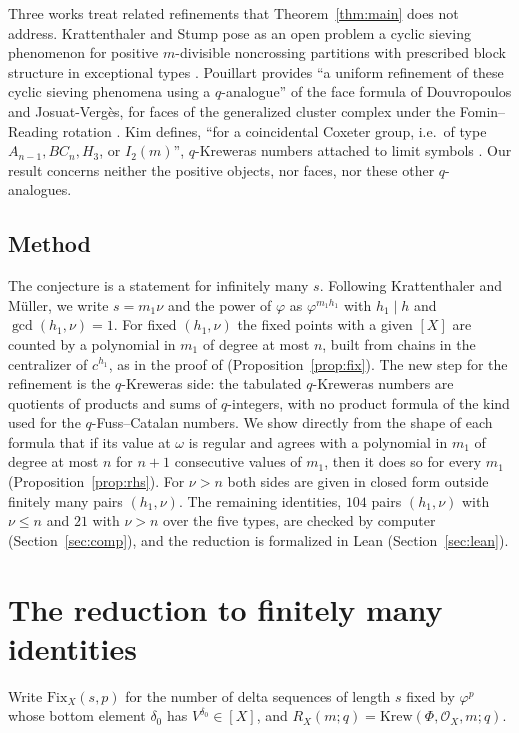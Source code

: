 \documentclass[11pt]{article}
\theoremstyle{definition}
\newcommand{\Krew}{\mathrm{Krew}}
\newcommand{\Fix}{\mathrm{Fix}}
\newcommand{\Oc}{\mathcal{O}}
\begin{document}
Three works treat related refinements that Theorem~\ref{thm:main} does
not address. Krattenthaler and Stump pose as an open problem a cyclic
sieving phenomenon for positive $m$-divisible noncrossing partitions with
prescribed block structure in exceptional types
\cite[\S7.2, Question~7.5 and Open Problem~7.6]{KS}. Pouillart provides ``a
uniform refinement of these cyclic sieving phenomena using a $q$-analogue''
of the face formula of Douvropoulos and Josuat-Vergès, for faces of the
generalized cluster complex under the Fomin--Reading rotation \cite{Pou}.
Kim defines, ``for a coincidental Coxeter group, i.e.\ of type $A_{n-1},
BC_n, H_3$, or $I_2(m)$'', $q$-Kreweras numbers attached to limit symbols
\cite{Kim}. Our result concerns neither the positive objects, nor faces, nor
these other $q$-analogues.

\subsection{Method}
The conjecture is a statement for infinitely many $s$. Following
Krattenthaler and Müller, we write $s=m_1\nu$ and the power of $\varphi$
as $\varphi^{m_1h_1}$ with $h_1\mid h$ and $\gcd(h_1,\nu)=1$. For fixed
$(h_1,\nu)$ the fixed points with a given $[X]$ are counted by a polynomial
in $m_1$ of degree at most $n$, built from chains in the centralizer of
$c^{h_1}$, as in the proof of \cite[Lemma~30]{KM}
(Proposition~\ref{prop:fix}). The new step for the refinement is the
$q$-Kreweras side: the tabulated $q$-Kreweras numbers are quotients of
products and sums of $q$-integers, with no product formula of the kind used
for the $q$-Fuss--Catalan numbers. We show directly from the shape of each
formula that if its value at $\omega$ is regular and agrees with a
polynomial in $m_1$ of degree at most $n$ for $n+1$ consecutive values of
$m_1$, then it does so for every $m_1$ (Proposition~\ref{prop:rhs}). For
$\nu>n$ both sides are given in closed form outside finitely many pairs
$(h_1,\nu)$. The remaining identities, $104$ pairs $(h_1,\nu)$ with $\nu\le
n$ and $21$ with $\nu>n$ over the five types, are checked by computer
(Section~\ref{sec:comp}), and the reduction is formalized in Lean
(Section~\ref{sec:lean}).

\section{The reduction to finitely many identities}\label{sec:red}

Write $\Fix_X(s,p)$ for the number of delta sequences of length $s$ fixed by
$\varphi^p$ whose bottom element $\delta_0$ has $V^{\delta_0}\in[X]$, and
$R_X(m;q)=\Krew(\Phi,\Oc_X,m;q)$.
\end{document}

